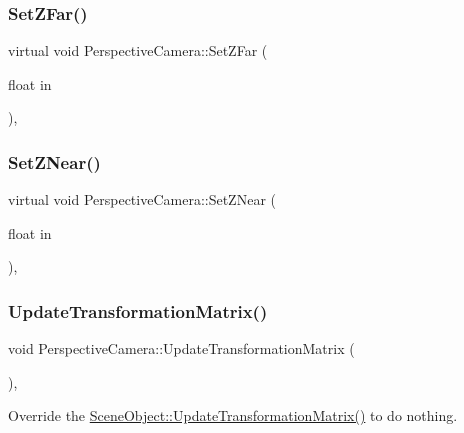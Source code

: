 \subsubsection{\texorpdfstring{Set\+Z\+Far()}{SetZFar()}}
{\footnotesize\ttfamily virtual void Perspective\+Camera\+::\+Set\+Z\+Far (\begin{DoxyParamCaption}\item[{float}]{in }\end{DoxyParamCaption})\hspace{0.3cm}{\ttfamily [inline]}, {\ttfamily [virtual]}}

\hypertarget{class_perspective_camera_ab9bab141c767e0b604b213f482f72c8a}{}\label{class_perspective_camera_ab9bab141c767e0b604b213f482f72c8a}
\subsubsection{\texorpdfstring{Set\+Z\+Near()}{SetZNear()}}
{\footnotesize\ttfamily virtual void Perspective\+Camera\+::\+Set\+Z\+Near (\begin{DoxyParamCaption}\item[{float}]{in }\end{DoxyParamCaption})\hspace{0.3cm}{\ttfamily [inline]}, {\ttfamily [virtual]}}

\hypertarget{class_perspective_camera_a2f17fb07425e2146d5692805753fa368}{}\label{class_perspective_camera_a2f17fb07425e2146d5692805753fa368}
\subsubsection{\texorpdfstring{Update\+Transformation\+Matrix()}{UpdateTransformationMatrix()}}
{\footnotesize\ttfamily void Perspective\+Camera\+::\+Update\+Transformation\+Matrix (\begin{DoxyParamCaption}{ }\end{DoxyParamCaption})\hspace{0.3cm}{\ttfamily [protected]}, {\ttfamily [virtual]}}



Override the \hyperlink{class_scene_object_a20e31da3f9d2765de50cdb2d637ae6c9}{Scene\+Object\+::\+Update\+Transformation\+Matrix()} to do nothing.

